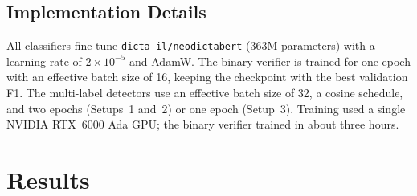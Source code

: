 \documentclass[11pt]{article}
\begin{document}
\subsection{Implementation Details}
All classifiers fine-tune \texttt{dicta-il/neodictabert} \citep{BenDavid2025neodictabert} (363M parameters) with a learning rate of $2\times10^{-5}$ and AdamW. The binary verifier is trained for one epoch with an effective batch size of 16, keeping the checkpoint with the best validation F1. The multi-label detectors use an effective batch size of 32, a cosine schedule, and two epochs (Setups~1 and~2) or one epoch (Setup~3). Training used a single NVIDIA RTX~6000 Ada GPU; the binary verifier trained in about three hours.

\section{Results}
\end{document}

